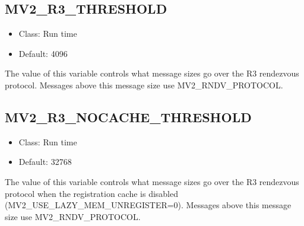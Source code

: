 \subsection{MV2\_R3\_THRESHOLD}
\begin{itemize}
    \item Class: Run time
    \item Default: 4096
\end{itemize}

The value of this variable controls what message sizes go over the 
R3 rendezvous protocol. Messages above this message size use
MV2\_RNDV\_PROTOCOL. 

\subsection{MV2\_R3\_NOCACHE\_THRESHOLD}
\begin{itemize}
    \item Class: Run time
    \item Default: 32768
\end{itemize}

The value of this variable controls what message sizes go over the 
R3 rendezvous protocol when the registration cache is disabled (MV2\_USE\_LAZY\_MEM\_UNREGISTER=0). Messages above this message size use
MV2\_RNDV\_PROTOCOL. 

